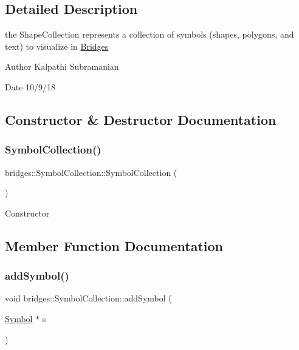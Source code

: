 \subsection{Detailed Description}
the Shape\+Collection represents a collection of symbols (shapes, polygons, and text) to visualize in \mbox{\hyperlink{classbridges_1_1_bridges}{Bridges}} 

\begin{DoxyAuthor}{Author}
Kalpathi Subramanian 
\end{DoxyAuthor}
\begin{DoxyDate}{Date}
10/9/18 
\end{DoxyDate}


\subsection{Constructor \& Destructor Documentation}
\mbox{\label{classbridges_1_1_symbol_collection_ae3b3dd944594e1ebac451c0557a45f80}} 
\subsubsection{\texorpdfstring{SymbolCollection()}{SymbolCollection()}}
{\footnotesize\ttfamily bridges\+::\+Symbol\+Collection\+::\+Symbol\+Collection (\begin{DoxyParamCaption}{ }\end{DoxyParamCaption})\hspace{0.3cm}{\ttfamily [inline]}}

Constructor 

\subsection{Member Function Documentation}
\mbox{\label{classbridges_1_1_symbol_collection_acdc101f6651becc430e281ed967ddedf}} 
\subsubsection{\texorpdfstring{addSymbol()}{addSymbol()}}
{\footnotesize\ttfamily void bridges\+::\+Symbol\+Collection\+::add\+Symbol (\begin{DoxyParamCaption}\item[{\mbox{\hyperlink{classbridges_1_1_symbol}{Symbol}} $\ast$}]{s }\end{DoxyParamCaption})\hspace{0.3cm}{\ttfamily [inline]}}

